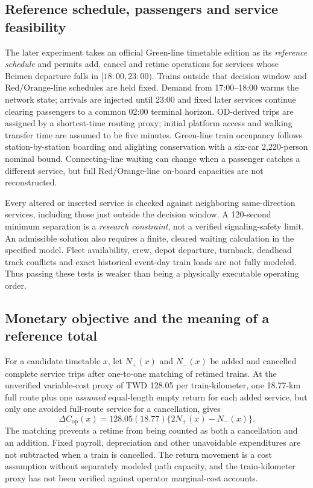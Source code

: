 \subsection{Reference schedule, passengers and service feasibility}
The later experiment takes an official Green-line timetable edition as its \emph{reference schedule} and permits add, cancel and retime operations for services whose Beimen departure falls in $[18{:}00,23{:}00)$. Trains outside that decision window and Red/Orange-line schedules are held fixed. Demand from 17:00--18:00 warms the network state; arrivals are injected until 23:00 and fixed later services continue clearing passengers to a common 02:00 terminal horizon. OD-derived trips are assigned by a shortest-time routing proxy; initial platform access and walking transfer time are assumed to be five minutes. Green-line train occupancy follows station-by-station boarding and alighting conservation with a six-car 2,220-person nominal bound. Connecting-line waiting can change when a passenger catches a different service, but full Red/Orange-line on-board capacities are not reconstructed.

Every altered or inserted service is checked against neighboring same-direction services, including those just outside the decision window. A 120-second minimum separation is a \emph{research constraint}, not a verified signaling-safety limit. An admissible solution also requires a finite, cleared waiting calculation in the specified model. Fleet availability, crew, depot departure, turnback, deadhead track conflicts and exact historical event-day train loads are not fully modeled. Thus passing these tests is weaker than being a physically executable operating order.

\subsection{Monetary objective and the meaning of a reference total}
For a candidate timetable $x$, let $N_+(x)$ and $N_-(x)$ be added and cancelled complete service trips after one-to-one matching of retimed trains. At the unverified variable-cost proxy of TWD 128.05 per train-kilometer, one 18.77-km full route plus one \emph{assumed} equal-length empty return for each added service, but only one avoided full-route service for a cancellation, gives
\begin{equation}
\Delta C_{\mathrm{op}}(x)=128.05(18.77)\{2N_+(x)-N_-(x)\}.
\label{eq:opcost}
\end{equation}
The matching prevents a retime from being counted as both a cancellation and an addition. Fixed payroll, depreciation and other unavoidable expenditures are not subtracted when a train is cancelled. The return movement is a cost assumption without separately modeled path capacity, and the train-kilometer proxy has not been verified against operator marginal-cost accounts.

